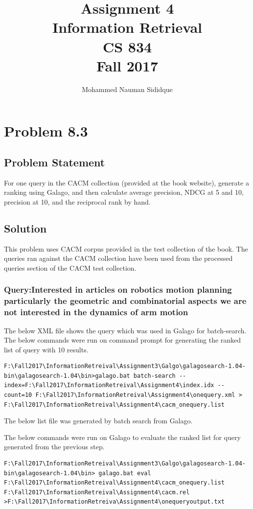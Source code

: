 \documentclass[12pt]{report}
\author{Mohammed Nauman Sididque}
\title{Assignment 4 \\Information Retrieval \\ CS 834 \\ Fall 2017 }
\begin{document}
\maketitle
\tableofcontents
\chapter{Problem 8.3}
\section{Problem Statement}
For one query in the CACM collection (provided at the book website), generate a ranking using Galago, and then calculate average precision, NDCG at 5 and 10, precision at 10, and the reciprocal rank by hand.
\section{Solution}
This problem uses CACM corpus provided in the test collection of the book. The queries ran against the CACM collection have been used from the processed queries section of the CACM test collection.\\

\subsection{Query:Interested in articles on robotics motion planning particularly the geometric and combinatorial aspects we are not interested in the dynamics of arm motion}

The below XML file shows the query which was used in Galago for batch-search.\\


The below commands were run on command prompt for generating the ranked list of query with 10 results. 
\begin{lstlisting}[style=DOS]
F:\Fall2017\InformationRetreival\Assignment3\Galgo\galagosearch-1.04-bin\galagosearch-1.04\bin>galago.bat batch-search --index=F:\Fall2017\InformationRetreival\Assignment4\index.idx --count=10 F:\Fall2017\InformationRetreival\Assignment4\onequery.xml > F:\Fall2017\InformationRetreival\Assignment4\cacm_onequery.list
\end{lstlisting}

The below list file was generated by batch search from Galago.


The below commands were run on Galago to evaluate the ranked list for query generated from the previous step.
\begin{lstlisting}[style=DOS]
F:\Fall2017\InformationRetreival\Assignment3\Galgo\galagosearch-1.04-bin\galagosearch-1.04\bin> galago.bat eval F:\Fall2017\InformationRetreival\Assignment4\cacm_onequery.list  F:\Fall2017\InformationRetreival\Assignment4\cacm.rel >F:\Fall2017\InformationRetreiva\Assignment4\onequeryoutput.txt
\end{lstlisting}
\end{document}

